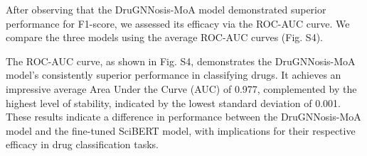 \documentclass[journal,twoside,web]{ieeecolor}
\begin{document}


After observing that the DruGNNosis-MoA model demonstrated superior performance for F1-score, we assessed its efficacy via the ROC-AUC curve.
We compare the three models using the average ROC-AUC curves (Fig. S4).%




The ROC-AUC curve, as shown in Fig. S4,
demonstrates the DruGNNosis-MoA model's consistently superior performance in classifying drugs.
It achieves an impressive average Area Under the Curve (AUC) of 0.977, complemented by the highest level of stability, indicated by the lowest standard deviation of 0.001.
These results indicate a difference in performance between the DruGNNosis-MoA model and the fine-tuned SciBERT model, with implications for their respective efficacy in drug classification tasks.
\end{document}
